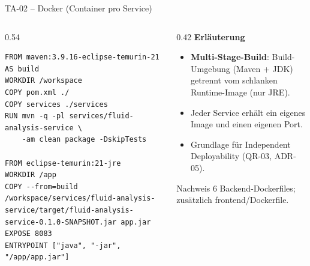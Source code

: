 \begin{frame}[fragile]{TA-02 -- Docker (Container pro Service)}
  \begin{columns}[T,onlytextwidth]
    \begin{column}{0.54\textwidth}
      \begin{lstlisting}[style=docker]
FROM maven:3.9.16-eclipse-temurin-21 AS build
WORKDIR /workspace
COPY pom.xml ./
COPY services ./services
RUN mvn -q -pl services/fluid-analysis-service \
    -am clean package -DskipTests

FROM eclipse-temurin:21-jre
WORKDIR /app
COPY --from=build /workspace/services/fluid-analysis-service/target/fluid-analysis-service-0.1.0-SNAPSHOT.jar app.jar
EXPOSE 8083
ENTRYPOINT ["java", "-jar", "/app/app.jar"]
      \end{lstlisting}
    \end{column}
    \begin{column}{0.42\textwidth}
      \textbf{Erläuterung}
      \begin{itemize}
        \item \textbf{Multi-Stage-Build}: Build-Umgebung (Maven + JDK) getrennt vom schlanken Runtime-Image (nur JRE).
        \item Jeder Service erhält ein eigenes Image und einen eigenen Port.
        \item Grundlage für Independent Deployability (QR-03, ADR-05).
      \end{itemize}
      \vspace{0.2cm}
      \begin{block}{Nachweis}
        \small 6 Backend-Dockerfiles; zusätzlich frontend/Dockerfile.
      \end{block}
    \end{column}
  \end{columns}
\end{frame}

